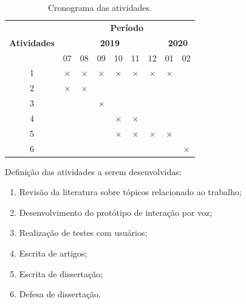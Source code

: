 \documentclass[
	12pt,				%
	openright,			%
	oneside,			%
	a4paper,			%
	english,			%
	brazil				%
	]{abntex2}
\begin{document}
\begin{table}[!h]
\centering
\def\arraystretch{1.25}
\caption{Cronograma das atividades.}
\label{tab:test3_normality}
\begin{tabular}{|c|c|c|c|c|c|c|c|c|}

\hline

\multirow{ 3}{*}{\textbf{Atividades}}&\multicolumn{8}{c|}{\textbf{Período}}\\\cline{2-9}

& \multicolumn{6}{c|}{\textbf{2019}} &\multicolumn{2}{c|}{\textbf{2020}}\\\cline{2-9}

& 07 & 08 & 09 & 10 & 11 & 12 & 01 & 02\\
\hline

1 & \cellcolor{green!25}$\times$& \cellcolor{green!25}$\times$ & \cellcolor{green!25}$\times$ & \cellcolor{green!25}$\times$ & \cellcolor{green!25}$\times$ & \cellcolor{green!25}$\times$ &\cellcolor{green!25}$\times$ &~\\


2 & \cellcolor{green!25}$\times$ & \cellcolor{green!25}$\times$ &~&~&~&~&~&~\\


3 & ~&~&\cellcolor{green!25}$\times$ &~&~&~&~&~\\


4 &~&~&~&\cellcolor{green!25}$\times$&\cellcolor{green!25}$\times$&~&~&~\\



5 &~&~&~&\cellcolor{green!25}$\times$&\cellcolor{green!25}$\times$&\cellcolor{green!25}$\times$&\cellcolor{green!25}$\times$&~\\


6 &~&~&~&~&~&~&~&\cellcolor{green!25}$\times$\\


\hline
\end{tabular}
\end{table}



Definição das atividades a serem desenvolvidas:
\begin{enumerate}
    \item Revisão da literatura sobre tópicos relacionado ao trabalho;
    \item Desenvolvimento do protótipo de interação por voz;
    \item Realização de testes com usuários;
    \item Escrita de artigos;
    \item Escrita de dissertação;
    \item Defesa de dissertação.
\end{enumerate}
\end{document}
